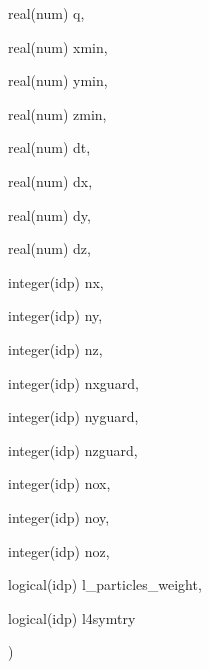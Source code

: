 {\begin{DoxyParamCaption}
\item[{real(num)}]{q, }
\item[{real(num)}]{xmin, }
\item[{real(num)}]{ymin, }
\item[{real(num)}]{zmin, }
\item[{real(num)}]{dt, }
\item[{real(num)}]{dx, }
\item[{real(num)}]{dy, }
\item[{real(num)}]{dz, }
\item[{integer(idp)}]{nx, }
\item[{integer(idp)}]{ny, }
\item[{integer(idp)}]{nz, }
\item[{integer(idp)}]{nxguard, }
\item[{integer(idp)}]{nyguard, }
\item[{integer(idp)}]{nzguard, }
\item[{integer(idp)}]{nox, }
\item[{integer(idp)}]{noy, }
\item[{integer(idp)}]{noz, }
\item[{logical(idp)}]{l\+\_\+particles\+\_\+weight, }
\item[{logical(idp)}]{l4symtry}
\end{DoxyParamCaption}
)}\hypertarget{current__deposition_8_f90_ad43ded0ebf597e9d3cb47ff84ec04413}{}\label{current__deposition_8_f90_ad43ded0ebf597e9d3cb47ff84ec04413}
